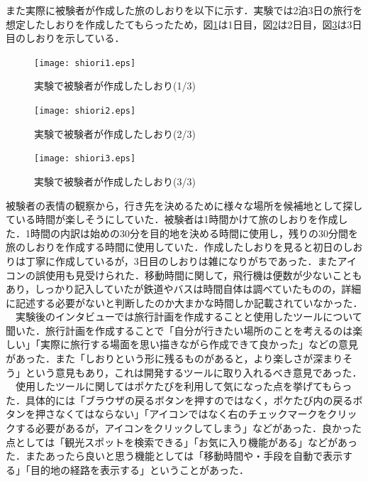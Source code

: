 \documentclass{funthesis}
\begin{document}
また実際に被験者が作成した旅のしおりを以下に示す．実験では2泊3日の旅行を想定したしおりを作成したてもらったため，図\ref{Lshiori1}は1日目，図\ref{Lshiori2}は2日目，図\ref{Lshiori3}は3日目のしおりを示している．

\begin{figure}[htpb]
\begin{center}
\texttt{[image: shiori1.eps]}
\end{center}
\caption{実験で被験者が作成したしおり(1/3)}
\label{Lshiori1}
\end{figure}

\begin{figure}[htpb]
\begin{center}
\texttt{[image: shiori2.eps]}
\end{center}
\caption{実験で被験者が作成したしおり(2/3)}
\label{Lshiori2}
\end{figure}

\begin{figure}[htpb]
\begin{center}
\texttt{[image: shiori3.eps]}
\end{center}
\caption{実験で被験者が作成したしおり(3/3)}
\label{Lshiori3}
\end{figure}


被験者の表情の観察から，行き先を決めるために様々な場所を候補地として探している時間が楽しそうにしていた．被験者は1時間かけて旅のしおりを作成した．1時間の内訳は始めの30分を目的地を決める時間に使用し，残りの30分間を旅のしおりを作成する時間に使用していた．作成したしおりを見ると初日のしおりは丁寧に作成しているが，3日目のしおりは雑になりがちであった．またアイコンの誤使用も見受けられた．移動時間に関して，飛行機は便数が少ないこともあり，しっかり記入していたが鉄道やバスは時間自体は調べていたものの，詳細に記述する必要がないと判断したのか大まかな時間しか記載されていなかった．\\
　実験後のインタビューでは旅行計画を作成することと使用したツールについて聞いた．旅行計画を作成することで「自分が行きたい場所のことを考えるのは楽しい」「実際に旅行する場面を思い描きながら作成できて良かった」などの意見があった．また「しおりという形に残るものがあると，より楽しさが深まりそう」という意見もあり，これは開発するツールに取り入れるべき意見であった．\\
　使用したツールに関してはポケたびを利用して気になった点を挙げてもらった．具体的には「ブラウザの戻るボタンを押すのではなく，ポケたび内の戻るボタンを押さなくてはならない」「アイコンではなく右のチェックマークをクリックする必要があるが，アイコンをクリックしてしまう」などがあった．良かった点としては「観光スポットを検索できる」「お気に入り機能がある」などがあった．またあったら良いと思う機能としては「移動時間や・手段を自動で表示する」「目的地の経路を表示する」ということがあった．
\end{document}
